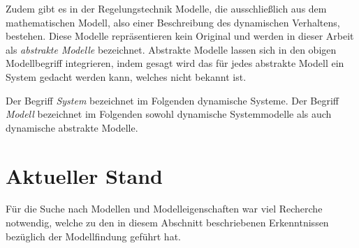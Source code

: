 Zudem gibt es in der Regelungstechnik Modelle, die ausschließlich aus dem mathematischen Modell, also einer Beschreibung des dynamischen Verhaltens, bestehen. Diese Modelle repräsentieren kein Original und werden in dieser Arbeit als \textit{abstrakte Modelle} bezeichnet. Abstrakte Modelle lassen sich in den obigen Modellbegriff integrieren, indem gesagt wird das für jedes abstrakte Modell ein System gedacht werden kann, welches nicht bekannt ist. 

Der Begriff \textit{System} bezeichnet im Folgenden dynamische Systeme. Der Begriff \textit{Modell} bezeichnet im Folgenden sowohl dynamische Systemmodelle als auch dynamische abstrakte Modelle.

\section{Aktueller Stand}
\label{Ch:Vorbetrachtung:Sec:CurrentState}
Für die Suche nach Modellen und Modelleigenschaften war viel Recherche notwendig, welche zu den in diesem Abschnitt beschriebenen Erkenntnissen bezüglich der Modellfindung geführt hat.

